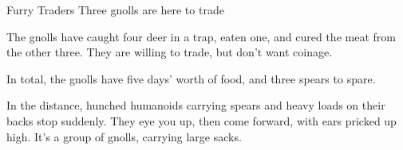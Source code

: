 {Furry Traders}%
{Three gnolls are here to trade}%

The gnolls have caught four deer in a trap, eaten one, and cured the meat from the other three.
They are willing to trade, but don't want coinage.

In total, the gnolls have five days' worth of food, and three spears to spare.

\begin{boxtext}
  In the distance, hunched humanoids carrying spears and heavy loads on their backs stop suddenly.
  They eye you up, then come forward, with ears pricked up high.
  It's a group of gnolls, carrying large sacks.
\end{boxtext}


